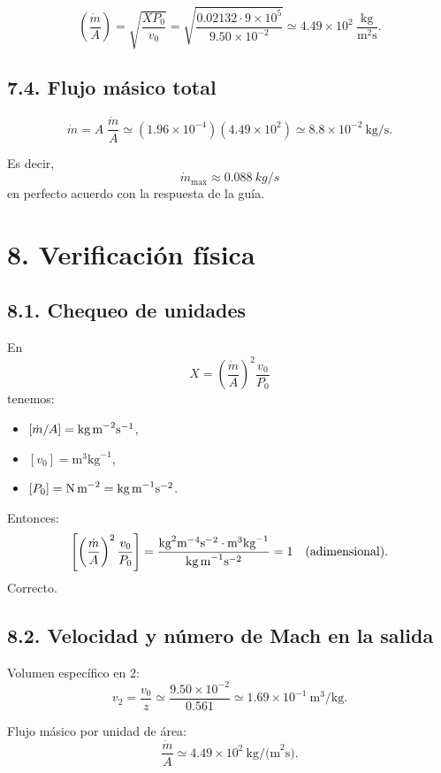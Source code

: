 \documentclass[11pt,a4paper]{article}
\begin{document}
\[
\left(\frac{\dot m}{A}\right)
= \sqrt{\frac{X P_0}{v_0}}
= \sqrt{\frac{0.02132 \cdot 9\times10^5}{9.50\times10^{-2}}}
\simeq 4.49\times10^{2}\ \frac{\text{kg}}{\text{m}^2\text{s}}.
\]

\subsection*{7.4. Flujo másico total}

\[
\dot m = A\;\frac{\dot m}{A}
\simeq (1.96\times10^{-4})
       (4.49\times10^{2})
\simeq 8.8\times10^{-2}\ \text{kg/s}.
\]

Es decir,
\[
\boxed{\dot m_{\max} \approx \SI{0.088}{kg/s}}
\]
en perfecto acuerdo con la respuesta de la guía.

\section*{8. Verificación física}

\subsection*{8.1. Chequeo de unidades}

En
\[
X = \left(\frac{\dot m}{A}\right)^2 \frac{v_0}{P_0}
\]
tenemos:
\begin{itemize}
  \item $[\dot m/A] = \text{kg\,m}^{-2}\text{s}^{-1}$,
  \item $[v_0] = \text{m}^3\text{kg}^{-1}$,
  \item $[P_0] = \text{N\,m}^{-2} = \text{kg\,m}^{-1}\text{s}^{-2}$.
\end{itemize}
Entonces:
\[
\left[\left(\frac{\dot m}{A}\right)^2 \frac{v_0}{P_0}\right]
= \frac{\text{kg}^2\text{m}^{-4}\text{s}^{-2}\cdot \text{m}^3\text{kg}^{-1}}
        {\text{kg\,m}^{-1}\text{s}^{-2}}
= 1\quad (\text{adimensional}).
\]
Correcto.

\subsection*{8.2. Velocidad y número de Mach en la salida}

Volumen específico en 2:
\[
v_2 = \frac{v_0}{z} \simeq \frac{9.50\times10^{-2}}{0.561}
      \simeq 1.69\times10^{-1}\ \text{m}^3/\text{kg}.
\]

Flujo másico por unidad de área:
\[
\frac{\dot m}{A} \simeq 4.49\times10^{2}\ \text{kg/(m}^2\text{s)}.
\]
\end{document}
